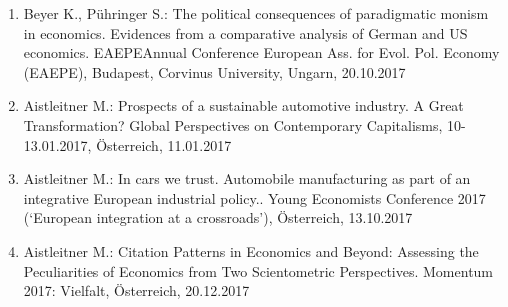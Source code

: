 \begin{enumerate}
	\item Beyer K., Pühringer S.: The political consequences of paradigmatic monism in economics. Evidences from a comparative analysis of German and US economics. EAEPEAnnual Conference European Ass. for Evol. Pol. Economy (EAEPE), Budapest, Corvinus University, Ungarn, 20.10.2017
	\item Aistleitner M.: Prospects of a sustainable automotive industry. A Great Transformation? Global Perspectives on Contemporary Capitalisms, 10-13.01.2017, Österreich, 11.01.2017
	\item Aistleitner M.: In cars we trust. Automobile manufacturing as part of an integrative European industrial policy.. Young Economists Conference 2017 (‘European integration at a crossroads’), Österreich, 13.10.2017
	\item Aistleitner M.: Citation Patterns in Economics and Beyond: Assessing the Peculiarities of Economics from Two Scientometric Perspectives. Momentum 2017: Vielfalt, Österreich, 20.12.2017
\end{enumerate}

